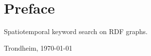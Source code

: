\section*{Preface}

Spatiotemporal keyword search on RDF graphs.

\vfill

\hfill \thesisAuthor

\hfill Trondheim, \today
